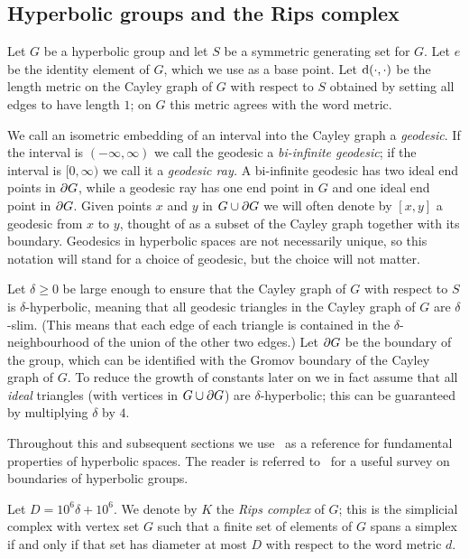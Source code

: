 \documentclass[a4paper]{article}
\begin{document}
\subsection{Hyperbolic groups and the Rips complex}

Let $G$ be a hyperbolic group and let $S$ be a symmetric generating set for
$G$. Let $e$ be the identity element of $G$, which we use as a base point. Let
$\operatorname{d}(\cdot, \cdot)$ be the length metric on the Cayley graph of $G$ with
respect to $S$ obtained by setting all edges to have length $1$; on $G$ this
metric agrees with the word metric. 

We call an isometric embedding of an interval into the Cayley graph a
\emph{geodesic}. If the interval is $(-\infty, \infty)$ we call the geodesic a
\emph{bi-infinite geodesic}; if the interval is $[0, \infty)$ we call it a
\emph{geodesic ray.} A bi-infinite geodesic has two ideal end points in
$\partial G$, while a geodesic ray has one end point in $G$ and one ideal end
point in $\partial G$.  Given points $x$ and $y$ in $G \cup \partial G$ we
will often denote by $[x,y]$ a geodesic from $x$ to $y$, thought of as a subset
of the Cayley graph together with its boundary. Geodesics in hyperbolic spaces
are not necessarily unique, so this notation will stand for a choice of
geodesic, but the choice will not matter.

Let $\delta \geq 0$ be large enough to ensure that the Cayley graph of $G$ with
respect to $S$ is $\delta$-hyperbolic, meaning that all geodesic triangles in
the Cayley graph of $G$ are $\delta$-slim. (This means that each edge of each
triangle is contained in the $\delta$-neighbourhood of the union of the other
two edges.) Let $\partial G$ be the boundary of the group, which can be
identified with the Gromov boundary of the Cayley graph of $G$. To reduce the
growth of constants later on we in fact assume that all \emph{ideal} triangles
(with vertices in $G \cup \partial G$) are $\delta$-hyperbolic; this can be
guaranteed by multiplying $\delta$ by $4$.  

Throughout this and subsequent sections we use~\cite{bridsonhaefliger99} as a
reference for fundamental properties of hyperbolic spaces. The reader is
referred to~\cite{benaklikapovich00} for a useful survey on boundaries of
hyperbolic groups.

\begin{definition}
  Let $D = 10^6\delta + 10^6$.  We denote by $K$ the \emph{Rips complex} of
  $G$; this is the simplicial complex with vertex set $G$ such that a finite
  set of elements of $G$ spans a simplex if and only if that set has diameter
  at most $D$ with respect to the word metric $d$.
\end{definition}
\end{document}
